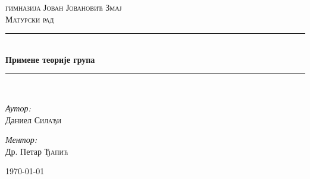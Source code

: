 \documentclass{report}
\theoremstyle{plain}
\theoremstyle{definition}
\newcommand{\HRule}{\rule{\linewidth}{0.5mm}}
\begin{document}
\begin{titlepage}
\begin{center}

\textsc{\LARGE гимназија Јован Јовановић Змај}\\[1.5cm]

\textsc{\Large Матурски рад}\\[0.5cm]

\HRule \\[0.4cm]
{ \huge \bfseries Примене теорије група \\[0.4cm] }

\HRule \\[1.5cm]

\begin{minipage}{0.4\textwidth}
\begin{flushleft} \large
\emph{Аутор:}\\
Даниел \textsc{Силађи}
\end{flushleft}
\end{minipage}
\begin{minipage}{0.4\textwidth}
\begin{flushright} \large
\emph{Ментор:} \\
Др. Петар \textsc{Ђапић}
\end{flushright}
\end{minipage}

\vfill

{\large \today}

\end{center}
\end{titlepage}

\setcounter{tocdepth}{1}
\tableofcontents
\end{document}
